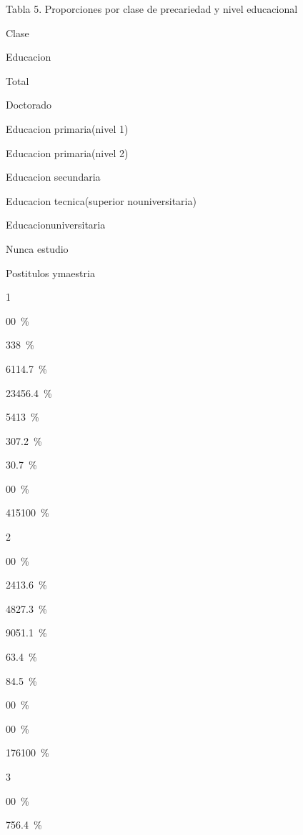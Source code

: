 \documentclass[
]{article}
\newenvironment{Shaded}{\begin{snugshade}}{\end{snugshade}}
\newcommand{\AttributeTok}[1]{\textcolor[rgb]{0.77,0.63,0.00}{#1}}
\newcommand{\CommentTok}[1]{\textcolor[rgb]{0.56,0.35,0.01}{\textit{#1}}}
\newcommand{\ConstantTok}[1]{\textcolor[rgb]{0.00,0.00,0.00}{#1}}
\newcommand{\FunctionTok}[1]{\textcolor[rgb]{0.00,0.00,0.00}{#1}}
\newcommand{\NormalTok}[1]{#1}
\newcommand{\SpecialCharTok}[1]{\textcolor[rgb]{0.00,0.00,0.00}{#1}}
\newcommand{\StringTok}[1]{\textcolor[rgb]{0.31,0.60,0.02}{#1}}
\begin{document}
\begin{Shaded}
\end{Shaded}

Tabla 5. Proporciones por clase de precariedad y nivel educacional

Clase

Educacion

Total

Doctorado

Educacion primaria(nivel 1)

Educacion primaria(nivel 2)

Educacion secundaria

Educacion tecnica(superior nouniversitaria)

Educacionuniversitaria

Nunca estudio

Postitulos ymaestria

1

{0}{0~\%}

{33}{8~\%}

{61}{14.7~\%}

{234}{56.4~\%}

{54}{13~\%}

{30}{7.2~\%}

{3}{0.7~\%}

{0}{0~\%}

{415}{100~\%}

2

{0}{0~\%}

{24}{13.6~\%}

{48}{27.3~\%}

{90}{51.1~\%}

{6}{3.4~\%}

{8}{4.5~\%}

{0}{0~\%}

{0}{0~\%}

{176}{100~\%}

3

{0}{0~\%}

{75}{6.4~\%}
\end{document}

